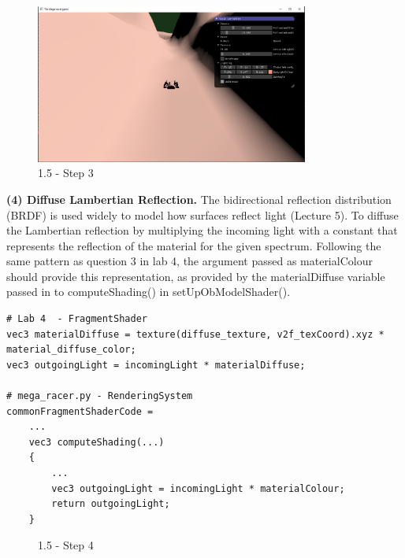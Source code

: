 \documentclass[a4 paper, 12pt]{article}
\begin{document}
    \begin{figure} [H]
        \centering
        \includegraphics[width=0.8\textwidth, frame]
            {./images/mega_racer/1.5_c.PNG}
        \caption{1.5 - Step 3}
    \end{figure}
    
\textbf{(4) Diffuse Lambertian Reflection.}
The bidirectional reflection distribution (BRDF) is used widely to model how surfaces reflect light (Lecture 5). To diffuse the Lambertian reflection by multiplying the incoming light with a constant that represents the reflection of the material for the given spectrum. Following the same pattern as question 3 in lab 4, the argument passed as materialColour should provide this representation, as provided by the materialDiffuse variable passed in to computeShading() in setUpObModelShader(). 
    \begin{lstlisting} 
# Lab 4  - FragmentShader
vec3 materialDiffuse = texture(diffuse_texture, v2f_texCoord).xyz * material_diffuse_color;
vec3 outgoingLight = incomingLight * materialDiffuse;

# mega_racer.py - RenderingSystem
commonFragmentShaderCode =
    ...
    vec3 computeShading(...)
    {
        ...
        vec3 outgoingLight = incomingLight * materialColour;
        return outgoingLight;
    }                            
    \end{lstlisting}

    \begin{figure} [H]
        \caption{1.5 - Step 4}   
    \end{figure}
\end{document}
